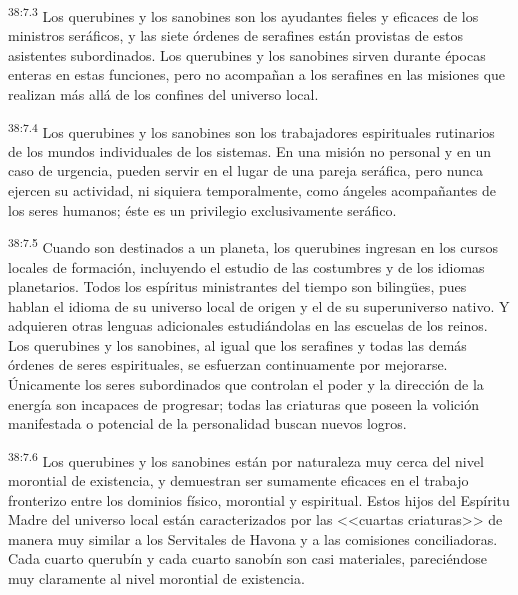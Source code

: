 \par
\textsuperscript{38:7.3} Los querubines y los sanobines son los ayudantes fieles y eficaces de los ministros seráficos, y las siete órdenes de serafines están provistas de estos asistentes subordinados. Los querubines y los sanobines sirven durante épocas enteras en estas funciones, pero no acompañan a los serafines en las misiones que realizan más allá de los confines del universo local.

\par
\textsuperscript{38:7.4} Los querubines y los sanobines son los trabajadores espirituales rutinarios de los mundos individuales de los sistemas. En una misión no personal y en un caso de urgencia, pueden servir en el lugar de una pareja seráfica, pero nunca ejercen su actividad, ni siquiera temporalmente, como ángeles acompañantes de los seres humanos; éste es un privilegio exclusivamente seráfico.

\par
\textsuperscript{38:7.5} Cuando son destinados a un planeta, los querubines ingresan en los cursos locales de formación, incluyendo el estudio de las costumbres y de los idiomas planetarios. Todos los espíritus ministrantes del tiempo son biling\"ues, pues hablan el idioma de su universo local de origen y el de su superuniverso nativo. Y adquieren otras lenguas adicionales estudiándolas en las escuelas de los reinos. Los querubines y los sanobines, al igual que los serafines y todas las demás órdenes de seres espirituales, se esfuerzan continuamente por mejorarse. Únicamente los seres subordinados que controlan el poder y la dirección de la energía son incapaces de progresar; todas las criaturas que poseen la volición manifestada o potencial de la personalidad buscan nuevos logros.

\par
\textsuperscript{38:7.6} Los querubines y los sanobines están por naturaleza muy cerca del nivel morontial de existencia, y demuestran ser sumamente eficaces en el trabajo fronterizo entre los dominios físico, morontial y espiritual. Estos hijos del Espíritu Madre del universo local están caracterizados por las <<cuartas criaturas>> de manera muy similar a los Servitales de Havona y a las comisiones conciliadoras. Cada cuarto querubín y cada cuarto sanobín son casi materiales, pareciéndose muy claramente al nivel morontial de existencia.

